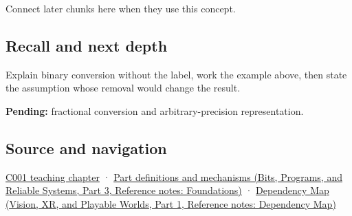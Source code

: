 \hypertarget{appendix-dc552784a2c0-used-by}{}

Connect later chunks here when they use this concept.

\subsection{Recall and next depth}\label{appendix-dc552784a2c0-recall-and-next-depth}

\hypertarget{appendix-dc552784a2c0-recall-and-next-depth}{}

Explain binary conversion without the label, work the example above, then state the assumption whose removal would change the result.

\textbf{Pending:} fractional conversion and arbitrary-precision representation.

\subsection{Source and navigation}\label{appendix-dc552784a2c0-source-and-navigation}

\hypertarget{appendix-dc552784a2c0-source-and-navigation}{}

\hyperref[01-foundations-i-ch001-from-a-signal-to-an-interpretation]{C001 teaching chapter} · \href{../01-Bits-Programs-and-Reliable-Systems-P03/main.pdf\#nameddest=appendix-fd090d982a15}{Part definitions and mechanisms (Bits, Programs, and Reliable Systems, Part 3, Reference notes: Foundations)} · \href{../07-Vision-XR-and-Playable-Worlds-P01/main.pdf\#nameddest=appendix-4ad47bdd269a}{Dependency Map (Vision, XR, and Playable Worlds, Part 1, Reference notes: Dependency Map)}
